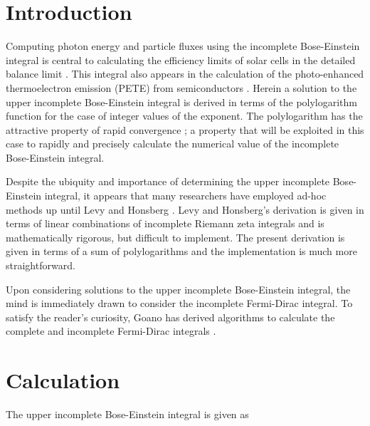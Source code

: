 \documentclass[letterpaper,12pt]{article}
\title{\Title}
\author{\AuthorName}
\begin{document}
\maketitle


\begin{abstract}
The upper incomplete Bose-Einstein integral is expressed in terms of a finite sum of polylogarithm functions.
\end{abstract}


\section{Introduction}
Computing photon energy and particle fluxes using the incomplete Bose-Einstein integral is central to calculating the efficiency limits of solar cells in the detailed balance limit \cite{10.1063/1.1736034}. This integral also appears in the calculation of the photo-enhanced thermoelectron emission (PETE) from semiconductors \cite{10.1038/nmat2814}. Herein a solution to the upper incomplete Bose-Einstein integral is derived in terms of the polylogarithm function for the case of integer values of the exponent. The polylogarithm has the attractive property of rapid convergence \cite{http://academic.reed.edu/physics/faculty/crandall/papers/Polylog}; a property that will be exploited in this case to rapidly and precisely calculate the numerical value of the incomplete Bose-Einstein integral.

Despite the ubiquity and importance of determining the upper incomplete Bose-Einstein integral, it appears that many researchers have employed ad-hoc methods up until Levy and Honsberg \cite{10.1016/j.sse.2006.06.017}. Levy and Honsberg's derivation is given in terms of linear combinations of incomplete Riemann zeta integrals and is mathematically rigorous, but difficult to implement. The present derivation is given in terms of a sum of polylogarithms and the implementation is much more straightforward.

Upon considering solutions to the upper incomplete Bose-Einstein integral, the mind is immediately drawn to consider the incomplete Fermi-Dirac integral. To satisfy the reader's curiosity, Goano has derived algorithms to calculate the complete and incomplete Fermi-Dirac integrals \cite{10.1145/210089.210090}.


\section{Calculation}
The upper incomplete Bose-Einstein integral is given as
\end{document}
